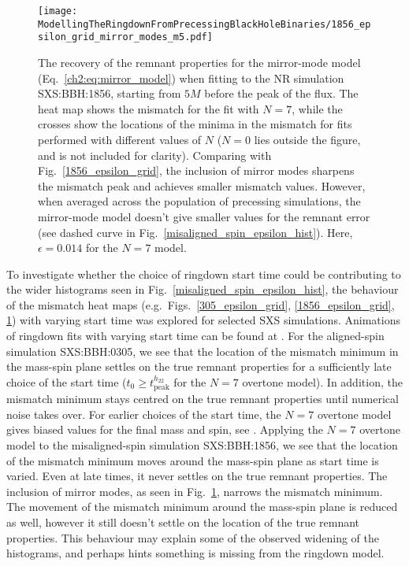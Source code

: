\begin{figure}[t]
    \centering
    \texttt{[image: ModellingTheRingdownFromPrecessingBlackHoleBinaries/1856\_epsilon\_grid\_mirror\_modes\_m5.pdf]}
    \caption[Recovery of the SXS:BBH:1856 remnant properties using the mirror-mode model starting from $5M$ before the peak of the GW energy flux]{ 
    The recovery of the remnant properties for the mirror-mode model (Eq.~\ref{ch2:eq:mirror_model}) when fitting to the NR simulation SXS:BBH:1856, starting from $5M$ before the peak of the flux. The heat map shows the mismatch for the fit with $N=7$, while the crosses show the locations of the minima in the mismatch for fits performed with different values of $N$ ($N=0$ lies outside the figure, and is not included for clarity). Comparing with Fig.~\ref{1856_epsilon_grid}, the inclusion of mirror modes sharpens the mismatch peak and achieves smaller mismatch values. However, when averaged across the population of precessing simulations, the mirror-mode model doesn't give smaller values for the remnant error (see dashed curve in Fig.~\ref{misaligned_spin_epsilon_hist}). Here, $\epsilon = 0.014$ for the $N=7$ model.
    }
    \label{1856_mirror_mode_epsilon_grid}
\end{figure}

To investigate whether the choice of ringdown start time could be contributing to the wider histograms seen in Fig.~\ref{misaligned_spin_epsilon_hist}, the behaviour of the mismatch heat maps (e.g.\ Figs.~\ref{305_epsilon_grid}, \ref{1856_epsilon_grid}, \ref{1856_mirror_mode_epsilon_grid}) with varying start time was explored for selected SXS simulations. 
Animations of ringdown fits with varying start time can be found at \cite{finch_eliot_2021_4538194}.
For the aligned-spin simulation SXS:BBH:0305, we see that the location of the mismatch minimum in the mass-spin plane settles on the true remnant properties for a sufficiently late choice of the start time ($t_0 \geq t_{\mathrm{peak}}^{h_{22}}$ for the $N=7$ overtone model). 
In addition, the mismatch minimum stays centred on the true remnant properties until numerical noise takes over.
For earlier choices of the start time, the $N=7$ overtone model gives biased values for the final mass and spin, see \cite{finch_eliot_2021_4538194}.
Applying the $N=7$ overtone model to the misaligned-spin simulation SXS:BBH:1856, we see that the location of the mismatch minimum moves around the mass-spin plane as start time is varied. Even at late times, it never settles on the true remnant properties.
The inclusion of mirror modes, as seen in Fig.~\ref{1856_mirror_mode_epsilon_grid}, narrows the mismatch minimum. The movement of the mismatch minimum around the mass-spin plane is reduced as well, however it still doesn't settle on the location of the true remnant properties.
This behaviour may explain some of the observed widening of the histograms, and perhaps hints something is missing from the ringdown model.


